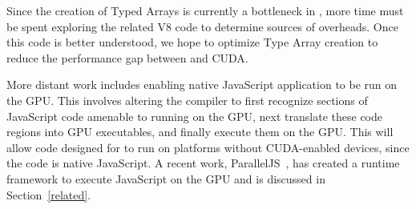 Since the creation of Typed Arrays is currently a bottleneck in \namens, more
time must be spent exploring the related V8 code to determine sources
of overheads. Once this code is better understood, we hope to optimize Type
Array creation to reduce the performance gap between \name and CUDA.

More distant work includes enabling native JavaScript application to be run on
the GPU. This involves altering the compiler to first recognize sections of JavaScript
code amenable to running on the GPU, next translate these code regions into GPU
executables, and finally execute them on the GPU. This will allow code
designed for \name to run on platforms without CUDA-enabled devices, since the
code is native JavaScript.  A recent work, ParallelJS~\cite{parallelJS}, has
created a runtime framework to execute JavaScript on the GPU and is discussed in
Section~\ref{related}.


